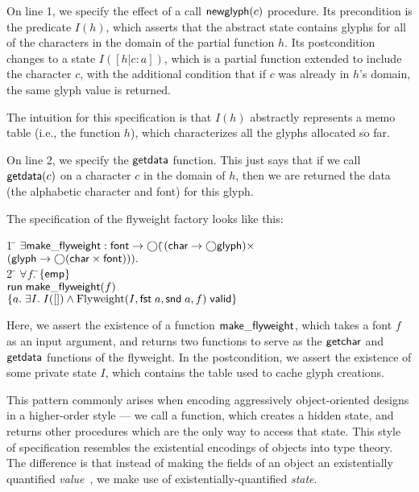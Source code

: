 On line 1, we specify the effect of a call $\mathsf{newglyph}(c)$
procedure. Its precondition is the predicate $I(h)$, which asserts
that the abstract state contains glyphs for all of the characters in
the domain of the partial function $h$. Its postcondition changes to a
state $I([h|c:a])$, which is a partial function extended to include
the character $c$, with the additional condition that if $c$ was
already in $h$'s domain, the same glyph value is returned. 

The intuition for this specification is that $I(h)$ abstractly represents
a memo table (i.e., the function $h$), which characterizes all the 
glyphs allocated so far. 

On line 2, we specify the $\mathsf{getdata}$ function. This just says 
that if we call $\mathsf{getdata}(c)$ on a character $c$ in the domain
of $h$, then we are returned the data (the alphabetic character 
and font) for this glyph. 

The specification of the flyweight factory looks like this:


\begin{tabbing}
1 \qquad \= $\exists \mathsf{make\_flyweight} :
\mathsf{font} \to \bigcirc($\=$(\mathsf{char} \to \bigcirc{\mathsf{glyph}}) \times$ \\
\> \> $(\mathsf{glyph} \to \bigcirc{(\mathsf{char}\times \mathsf{font})})).$\\
2 \> \;\;\= $\forall f.\;$\=$\{{\mathsf{emp}}\}$ \\
  \>\> \> $\mathsf{run}\;{\mathsf{make\_flyweight}(f)}$ \\
  \>\> \> $\{{a.\; \exists I.\; I([]) \land {\mbox{Flyweight}(I, \mathsf{fst}\; a, \mathsf{snd}\; a, f)}\;\mathsf{valid}}\}$ 
\end{tabbing}


Here, we assert the existence of a function $\mathsf{make\_flyweight}$,
which takes a font $f$ as an input argument, and returns two functions
to serve as the $\mathsf{getchar}$ and $\mathsf{getdata}$ functions of
the flyweight. In the postcondition, we assert the existence of some
private state $I$, which contains the table used to cache glyph
creations. 

This pattern commonly arises when encoding aggressively
object-oriented designs in a higher-order style --- we call a
function, which creates a hidden state, and returns other procedures
which are the only way to access that state. This style of
specification resembles the existential encodings of objects into type
theory. The difference is that instead of making the fields of an
object an existentially quantified \emph{value}~\cite{pierce-turner}, we
make use of existentially-quantified \emph{state}.

